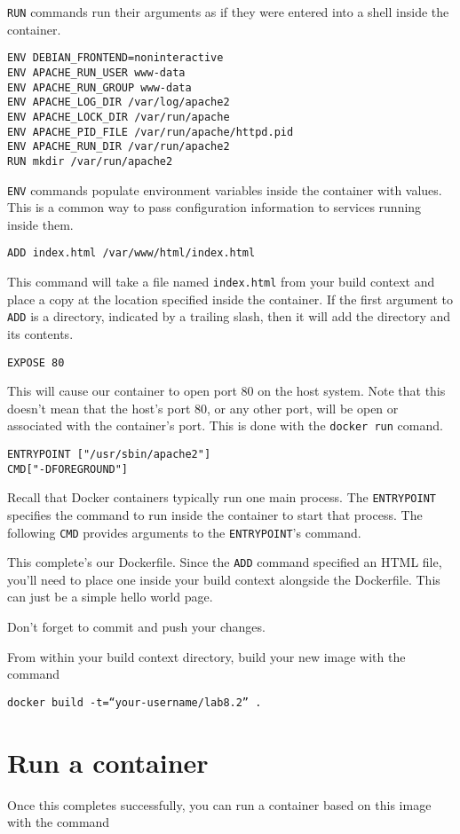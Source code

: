 \documentclass{article}
\begin{document}
\texttt{RUN} commands run their arguments as if they were entered into a shell inside the container.

\begin{verbatim}
ENV DEBIAN_FRONTEND=noninteractive
ENV APACHE_RUN_USER www-data
ENV APACHE_RUN_GROUP www-data
ENV APACHE_LOG_DIR /var/log/apache2
ENV APACHE_LOCK_DIR /var/run/apache
ENV APACHE_PID_FILE /var/run/apache/httpd.pid
ENV APACHE_RUN_DIR /var/run/apache2
RUN mkdir /var/run/apache2
\end{verbatim}

\texttt{ENV} commands populate environment variables inside the container with values. This is a common way to pass configuration information to services running inside them.

\texttt{ADD index.html /var/www/html/index.html }

This command will take a file named \texttt{index.html} from your build context and place a copy at the location specified inside the container. If the first argument to \texttt{ADD} is a directory, indicated by a trailing slash, then it will add the directory and its contents.

\texttt{EXPOSE 80}

This will cause our container to open port 80 on the host system.  Note that this doesn't mean that the host's port 80, or any other port, will be open or associated with the container's port.  This is done with the \texttt{docker run} comand.

\begin{verbatim}
ENTRYPOINT ["/usr/sbin/apache2"]
CMD["-DFOREGROUND"]
\end{verbatim}

Recall that Docker containers typically run one main process.  The \texttt{ENTRYPOINT} specifies the command to run inside the container to start that process. The following \texttt{CMD} provides arguments to the \texttt{ENTRYPOINT}'s command.

This complete's our Dockerfile.  Since the \texttt{ADD} command specified an HTML file, you'll need to place one inside your build context alongside the Dockerfile. This can just be a simple hello world page.

Don't forget to commit and push your changes.


From within your build context directory, build your new image with the command

\texttt{docker build -t=``your-username/lab8.2'' .}


\section{Run a container}
Once this completes successfully, you can run a container based on this image with the command 
\end{document}
